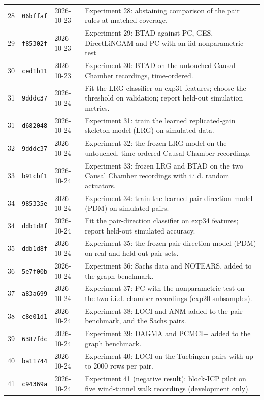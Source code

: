 \begin{longtable}{@{}rllp{9.8cm}@{}}
28 & \texttt{06bffaf} & 2026-10-23 & Experiment 28: abstaining comparison of the pair rules at matched coverage.\\
29 & \texttt{f85302f} & 2026-10-23 & Experiment 29: BTAD against PC, GES, DirectLiNGAM and PC with an iid nonparametric test\\
30 & \texttt{ced1b11} & 2026-10-23 & Experiment 30: BTAD on the untouched Causal Chamber recordings, time-ordered.\\
31 & \texttt{9dddc37} & 2026-10-24 & Fit the LRG classifier on exp31 features; choose the threshold on validation; report held-out simulation metrics.\\
31 & \texttt{d682048} & 2026-10-24 & Experiment 31: train the learned replicated-gain skeleton model (LRG) on simulated data.\\
32 & \texttt{9dddc37} & 2026-10-24 & Experiment 32: the frozen LRG model on the untouched, time-ordered Causal Chamber recordings.\\
33 & \texttt{b91cbf1} & 2026-10-24 & Experiment 33: frozen LRG and BTAD on the two Causal Chamber recordings with i.i.d. random actuators.\\
34 & \texttt{985335e} & 2026-10-24 & Experiment 34: train the learned pair-direction model (PDM) on simulated pairs.\\
34 & \texttt{ddb1d8f} & 2026-10-24 & Fit the pair-direction classifier on exp34 features; report held-out simulated accuracy.\\
35 & \texttt{ddb1d8f} & 2026-10-24 & Experiment 35: the frozen pair-direction model (PDM) on real and held-out pair sets.\\
36 & \texttt{5e7f00b} & 2026-10-24 & Experiment 36: Sachs data and NOTEARS, added to the graph benchmark.\\
37 & \texttt{a83a699} & 2026-10-24 & Experiment 37: PC with the nonparametric test on the two i.i.d. chamber recordings (exp20 subsamples).\\
38 & \texttt{c8e01d1} & 2026-10-24 & Experiment 38: LOCI and ANM added to the pair benchmark, and the Sachs pairs.\\
39 & \texttt{6387fdc} & 2026-10-24 & Experiment 39: DAGMA and PCMCI+ added to the graph benchmark.\\
40 & \texttt{ba11744} & 2026-10-24 & Experiment 40: LOCI on the Tuebingen pairs with up to 2000 rows per pair.\\
41 & \texttt{c94369a} & 2026-10-24 & Experiment 41 (negative result): block-ICP pilot on five wind-tunnel walk recordings (development only).\\

\end{longtable}
